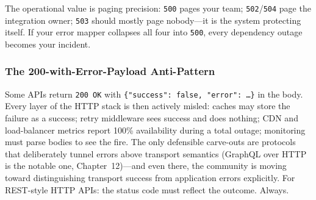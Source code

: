The operational value is paging precision: \texttt{500} pages your team;
\texttt{502}/\texttt{504} page the integration owner; \texttt{503} should
mostly page nobody---it is the system protecting itself. If your error
mapper collapses all four into \texttt{500}, every dependency outage becomes
your incident.

\subsubsection{The 200-with-Error-Payload Anti-Pattern}

Some APIs return \texttt{200 OK} with \texttt{\{"success": false,
"error": \ldots\}} in the body. Every layer of the HTTP stack is then
actively misled: caches may store the failure as a success; retry middleware
sees success and does nothing; CDN and load-balancer metrics report 100\%
availability during a total outage; monitoring must parse bodies to see the
fire. The only defensible carve-outs are protocols that deliberately tunnel
errors above transport semantics (GraphQL over HTTP is the notable one,
Chapter~12)---and even there, the community is moving toward distinguishing
transport success from application errors explicitly. For REST-style HTTP
APIs: the status code must reflect the outcome. Always.

